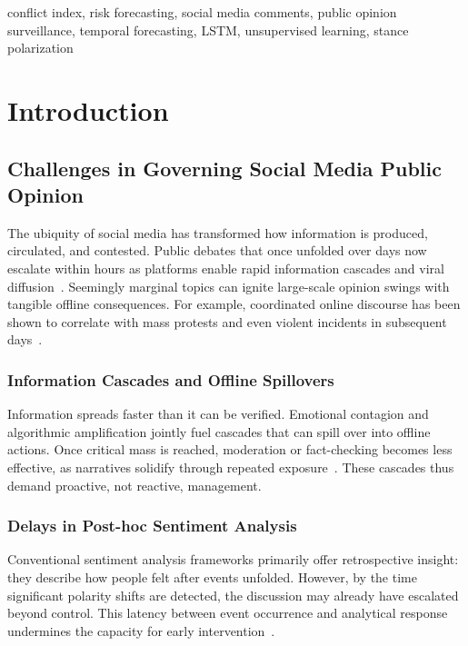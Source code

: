 \documentclass[journal]{IEEEtran}
\begin{document}
\begin{IEEEkeywords}
conflict index, risk forecasting, social media comments, public opinion surveillance, temporal forecasting, LSTM, unsupervised learning, stance polarization
\end{IEEEkeywords}

\section{Introduction}

\subsection{Challenges in Governing Social Media Public Opinion}
The ubiquity of social media has transformed how information is produced, circulated, and contested. Public debates that once unfolded over days now escalate within hours as platforms enable rapid information cascades and viral diffusion~\cite{Vosoughi2018}. Seemingly marginal topics can ignite large-scale opinion swings with tangible offline consequences. For example, coordinated online discourse has been shown to correlate with mass protests and even violent incidents in subsequent days~\cite{Steinert2015,Arcila2024}. 

\subsubsection{Information Cascades and Offline Spillovers}
Information spreads faster than it can be verified. Emotional contagion and algorithmic amplification jointly fuel cascades that can spill over into offline actions. Once critical mass is reached, moderation or fact-checking becomes less effective, as narratives solidify through repeated exposure~\cite{Vosoughi2018}. These cascades thus demand proactive, not reactive, management.

\subsubsection{Delays in Post-hoc Sentiment Analysis}
Conventional sentiment analysis frameworks primarily offer retrospective insight: they describe how people felt after events unfolded. However, by the time significant polarity shifts are detected, the discussion may already have escalated beyond control. This latency between event occurrence and analytical response undermines the capacity for early intervention~\cite{Wang2020}.
\end{document}
